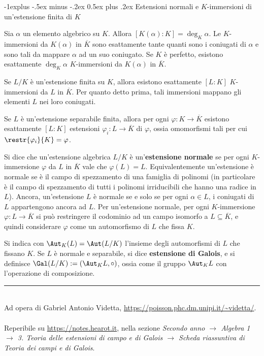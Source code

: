 \documentclass[10pt,landscape]{article}
\makeatletter
\renewcommand{\subsection}{\@startsection{subsection}{2}{0mm}%
	{-1explus -.5ex minus -.2ex}%
	{0.5ex plus .2ex}%
	{\normalfont\normalsize\bfseries}}
\makeatother
\begin{document}
\begin{multicols}{3}
		
		\subsection{Estensioni normali e $K$-immersioni di un'estensione finita di $K$}
		
		Sia $\alpha$ un elemento algebrico su $K$. Allora
		$[K(\alpha) : K] = \deg_K \alpha$. Le
		$K$-immersioni da $K(\alpha)$ in $\overline{K}$
		sono esattamente tante quanti sono i coniugati di
		$\alpha$ e sono tali da mappare $\alpha$ ad un suo coniugato. Se $K$ è perfetto, esistono esattamente
		$\deg_K \alpha$ $K$-immersioni da $K(\alpha)$
		in $\overline{K}$. \medskip
		
		
		Se $L / K$ è un'estensione finita su $K$, allora
		esistono esattamente $[L : K]$ $K$-immersioni
		da $L$ in $\overline{K}$. Per quanto detto prima,
		tali immersioni mappano gli elementi $L$ nei
		loro coniugati. \medskip
		
		
		Se $L$ è un'estensione separabile finita, allora per
		ogni $\varphi : K \to \overline{K}$ esistono
		esattamente $[L : K]$ estensioni $\varphi_i : L \to \overline{K}$ di $\varphi$, ossia omomorfismi
		tali per cui $\restr{\varphi_i}{K} = \varphi$. \medskip
		
		
		Si dice che un'estensione algebrica $L / K$ è un'\textbf{estensione normale}
		se per ogni $K$-immersione $\varphi$ da $L$ in $\overline{K}$
		vale che $\varphi(L) = L$. Equivalentemente
		un'estensione è normale se è il campo di spezzamento
		di una famiglia di polinomi (in particolare è il campo
		di spezzamento di tutti i polinomi irriducibili che
		hanno una radice in $L$). Ancora, un'estensione $L$
		è normale se e solo se per ogni $\alpha \in L$,
		i coniugati di $L$ appartengono ancora ad $L$.
		Per un'estensione normale, per ogni $K$-immersione
		$\varphi : L \to \overline{K}$ si può restringere
		il codominio ad un campo isomorfo a $L \subseteq \overline{K}$, e quindi considerare $\varphi$ come
		un automorfismo di $L$ che fissa $K$. \medskip
		
		
		Si indica con $\Aut_K(L) = \Aut(L / K)$ l'insieme
		degli automorfismi di $L$ che fissano $K$. Se
		$L$ è normale e separabile, si dice
		\textbf{estensione di Galois}, e si definisce
		$\Gal(L / K) := (\Aut_K L, \circ)$, ossia come
		il gruppo $\Aut_K L$ con l'operazione di
		composizione.
		
		
		\vfill
		\hrule
		~\\
		Ad opera di Gabriel Antonio Videtta, \url{https://poisson.phc.dm.unipi.it/~videtta/}.
		~\\Reperibile su
		\url{https://notes.hearot.it}, nella sezione \textit{Secondo anno $\to$ Algebra 1 $\to$ 3. Teoria delle estensioni di campo e di Galois $\to$ Scheda riassuntiva di Teoria dei campi e di Galois}.
	\end{multicols}
	
\end{document}
